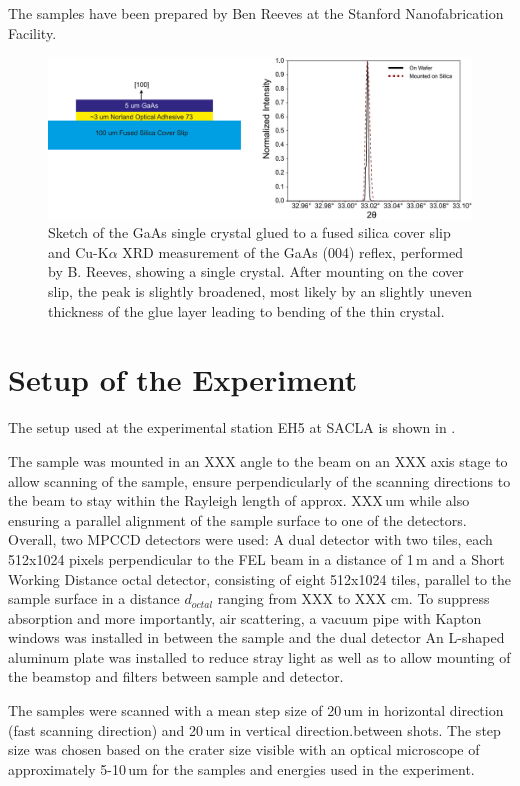 The samples have been prepared by Ben Reeves at the Stanford Nanofabrication Facility. 

\begin{figure}[tp]
	\centering
	\includegraphics[width=0.8\linewidth]{images/gaas_sample.pdf}
	\caption[GaAs Sample]{Sketch of the GaAs single crystal glued to a fused silica cover slip and Cu-K$\alpha$ XRD measurement of the GaAs (004) reflex, performed by B. Reeves, showing a single crystal. After mounting on the cover slip, the peak is slightly broadened, most likely by an slightly uneven thickness of the glue layer  leading to bending of the thin crystal.}
	\label{fig:gaas_sample}
\end{figure}


\section{Setup of the Experiment}
The setup used at the experimental station EH5 at SACLA is shown in . 

The sample was mounted in an XXX angle to the beam on an XXX axis stage to allow scanning of the sample, ensure perpendicularly of the scanning directions to the beam to stay within the Rayleigh length of approx. XXX\,um while also ensuring a parallel alignment of the sample surface to one of the detectors. Overall, two MPCCD detectors were used: A dual detector with two tiles, each 512x1024 pixels perpendicular to the FEL beam in a distance of 1\,m and a Short Working Distance octal detector, consisting of eight 512x1024 tiles, parallel to the sample surface in a distance $d_{octal}$ ranging from XXX to XXX cm. To suppress absorption and more importantly, air scattering, a vacuum pipe with Kapton windows was installed in between the sample and the dual detector
An L-shaped aluminum plate was installed to reduce stray light as well as to allow mounting of the beamstop and filters between sample and detector.

The samples were scanned with a mean step size of 20\,um in horizontal direction (fast scanning direction) and 20\,um in vertical direction.between shots. The step size was chosen based on the crater size visible with an optical microscope of approximately 5-10\,um for the samples and energies used in the experiment.

